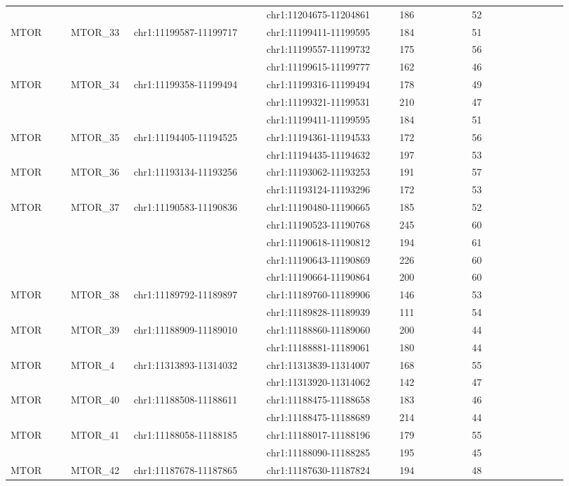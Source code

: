\begin{landscape}
\begin{longtable}{p{0.1\linewidth}|p{0.1\linewidth}p{0.22\linewidth}p{0.22\linewidth}p{0.12\linewidth}p{0.16\linewidth}}
 & & & chr1:11204675-11204861 & 186 & 52
\\
MTOR & MTOR\_33 & chr1:11199587-11199717 & chr1:11199411-11199595 & 184 & 51
\\
 & & & chr1:11199557-11199732 & 175 & 56
\\
 & & & chr1:11199615-11199777 & 162 & 46
\\
MTOR & MTOR\_34 & chr1:11199358-11199494 & chr1:11199316-11199494 & 178 & 49
\\
 & & & chr1:11199321-11199531 & 210 & 47
\\
 & & & chr1:11199411-11199595 & 184 & 51
\\
MTOR & MTOR\_35 & chr1:11194405-11194525 & chr1:11194361-11194533 & 172 & 56
\\
 & & & chr1:11194435-11194632 & 197 & 53
\\
MTOR & MTOR\_36 & chr1:11193134-11193256 & chr1:11193062-11193253 & 191 & 57
\\
 & & & chr1:11193124-11193296 & 172 & 53
\\
MTOR & MTOR\_37 & chr1:11190583-11190836 & chr1:11190480-11190665 & 185 & 52
\\
 & & & chr1:11190523-11190768 & 245 & 60
\\
 & & & chr1:11190618-11190812 & 194 & 61
\\
 & & & chr1:11190643-11190869 & 226 & 60
\\
 & & & chr1:11190664-11190864 & 200 & 60
\\
MTOR & MTOR\_38 & chr1:11189792-11189897 & chr1:11189760-11189906 & 146 & 53
\\
 & & & chr1:11189828-11189939 & 111 & 54
\\
MTOR & MTOR\_39 & chr1:11188909-11189010 & chr1:11188860-11189060 & 200 & 44
\\
 & & & chr1:11188881-11189061 & 180 & 44
\\
MTOR & MTOR\_4 & chr1:11313893-11314032 & chr1:11313839-11314007 & 168 & 55
\\
 & & & chr1:11313920-11314062 & 142 & 47
\\
MTOR & MTOR\_40 & chr1:11188508-11188611 & chr1:11188475-11188658 & 183 & 46
\\
 & & & chr1:11188475-11188689 & 214 & 44
\\
MTOR & MTOR\_41 & chr1:11188058-11188185 & chr1:11188017-11188196 & 179 & 55
\\
 & & & chr1:11188090-11188285 & 195 & 45
\\
MTOR & MTOR\_42 & chr1:11187678-11187865 & chr1:11187630-11187824 & 194 & 48

\end{longtable}
\end{landscape}
